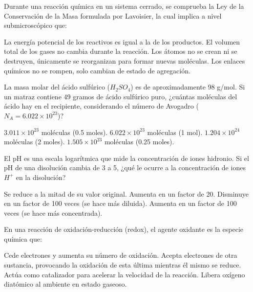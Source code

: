 \documentclass[12pt]{evaluasep}
\begin{document}
\begin{questions}
    \question Durante una reacción química en un sistema cerrado, se comprueba la Ley de la Conservación de la Masa formulada por Lavoisier, la cual implica a nivel submicroscópico que:
    \begin{choices}
        \choice La energía potencial de los reactivos es igual a la de los productos.
        \choice El volumen total de los gases no cambia durante la reacción.
        \CorrectChoice Los átomos no se crean ni se destruyen, únicamente se reorganizan para formar nuevas moléculas.
        \choice Los enlaces químicos no se rompen, solo cambian de estado de agregación.
    \end{choices}
    
      \question La masa molar del ácido sulfúrico ($H_2SO_4$) es de aproximadamente 98 g/mol. Si un matraz contiene 49 gramos de ácido sulfúrico puro, ¿cuántas moléculas del ácido hay en el recipiente, considerando el número de Avogadro ($N_A = 6.022 \times 10^{23}$)?
    \begin{choices}
        \CorrectChoice $3.011 \times 10^{23}$ moléculas (0.5 moles).
        \choice $6.022 \times 10^{23}$ moléculas (1 mol).
        \choice $1.204 \times 10^{24}$ moléculas (2 moles).
        \choice $1.505 \times 10^{23}$ moléculas (0.25 moles).
    \end{choices}

    \question El pH es una escala logarítmica que mide la concentración de iones hidronio. Si el pH de una disolución cambia de 3 a 5, ¿qué le ocurre a la concentración de iones $H^+$ en la disolución?
    \begin{choices}
        \choice Se reduce a la mitad de su valor original.
        \choice Aumenta en un factor de 20.
        \CorrectChoice Disminuye en un factor de 100 veces (se hace más diluida).
        \choice Aumenta en un factor de 100 veces (se hace más concentrada).
    \end{choices}

    \question En una reacción de oxidación-reducción (redox), el agente oxidante es la especie química que:
    \begin{choices}
        \choice Cede electrones y aumenta su número de oxidación.
        \CorrectChoice Acepta electrones de otra sustancia, provocando la oxidación de esta última mientras él mismo se reduce.
        \choice Actúa como catalizador para acelerar la velocidad de la reacción.
        \choice Libera oxígeno diatómico al ambiente en estado gaseoso.
    \end{choices}


\end{questions}
\end{document}
